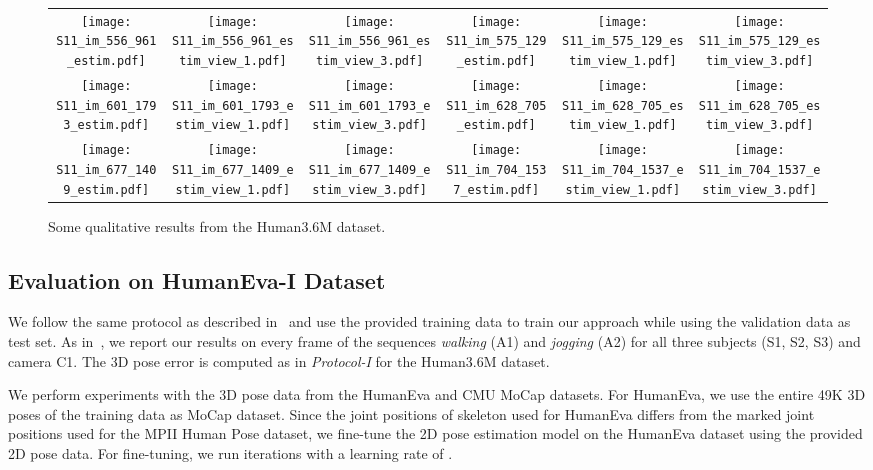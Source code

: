 \documentclass[10pt,journal,compsoc]{IEEEtran}
\begin{document}
\begin{figure*}
{\begin{tabular}{c c c | c c c}
\texttt{[image: S11\_im\_556\_961\_estim.pdf]} &
\texttt{[image: S11\_im\_556\_961\_estim\_view\_1.pdf]} &
\texttt{[image: S11\_im\_556\_961\_estim\_view\_3.pdf]} &
\texttt{[image: S11\_im\_575\_129\_estim.pdf]} &
\texttt{[image: S11\_im\_575\_129\_estim\_view\_1.pdf]} &
\texttt{[image: S11\_im\_575\_129\_estim\_view\_3.pdf]} \\
\texttt{[image: S11\_im\_601\_1793\_estim.pdf]} &
\texttt{[image: S11\_im\_601\_1793\_estim\_view\_1.pdf]} &
\texttt{[image: S11\_im\_601\_1793\_estim\_view\_3.pdf]} &
\texttt{[image: S11\_im\_628\_705\_estim.pdf]} &
\texttt{[image: S11\_im\_628\_705\_estim\_view\_1.pdf]} &
\texttt{[image: S11\_im\_628\_705\_estim\_view\_3.pdf]} \\
\texttt{[image: S11\_im\_677\_1409\_estim.pdf]} &
\texttt{[image: S11\_im\_677\_1409\_estim\_view\_1.pdf]} &
\texttt{[image: S11\_im\_677\_1409\_estim\_view\_3.pdf]} &
\texttt{[image: S11\_im\_704\_1537\_estim.pdf]} &
\texttt{[image: S11\_im\_704\_1537\_estim\_view\_1.pdf]} &
\texttt{[image: S11\_im\_704\_1537\_estim\_view\_3.pdf]} \\
\end{tabular}
}
\vspace{1em}
\caption{Some qualitative results from the Human3.6M \cite{h36m_pami} dataset.}
\label{fig:qualitative_h36m}
\end{figure*}


\subsection{Evaluation on HumanEva-I Dataset}\label{sec:EvaI}
We follow the same protocol as described in~\cite{SimoSerraCVPR2013,Ilya_2014} and use the provided training data to train our approach while 
using the validation data as test set. As in~\cite{SimoSerraCVPR2013,Ilya_2014}, we report our results on every  frame of the 
sequences \textit{walking} (A1) and \textit{jogging} (A2) for all three subjects (S1, S2, S3) and camera C1. The 3D pose error is computed as in \emph{Protocol-I} for the Human3.6M dataset. 

We perform experiments with the 3D pose data from the HumanEva and CMU MoCap datasets. For HumanEva, we use the entire 49K 3D poses of the training data as MoCap dataset. Since the joint positions of skeleton used for HumanEva differs from the marked joint positions used for the MPII Human Pose dataset, we fine-tune the 2D pose estimation model on the HumanEva dataset using the provided 2D pose data.  
For fine-tuning, we run  iterations with a learning rate of . 
\end{document}

